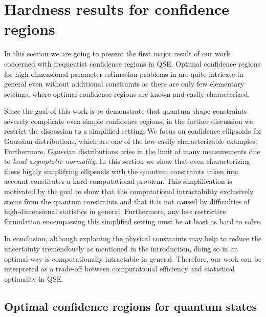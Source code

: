 \section{Hardness results for confidence regions}
\label{sec:error.ortho}

In this section we are going to present the first major result of our work~\cite{Suess_2016_Error} concerned with frequentist confidence regions in QSE.
Optimal confidence regions for high-dimensional parameter estimation problems in are quite intricate in general even without additional constraints as there are only few elementary settings, where optimal confidence regions are known and easily characterized.

Since the goal of this work is to demonstrate that quantum shape constraints severely complicate even  simple confidence regions, in the further discussion we restrict the discussion to a simplified setting:
We focus on confidence ellipsoids for Gaussian distributions, which are one of the few easily characterizable examples.
Furthermore, Gaussian distributions arise in the limit of many measurements due to \emph{local asymptotic normality}.
In this section we show that even characterizing these highly simplifying ellipsoids with the quantum constraints taken into account constitutes a hard computational problem.
This simplification is motivated by the goal to show that the computational intractability exclusively stems from the quantum constraints and that it is not caused by difficulties of high-dimensional statistics in general.
Furthermore, any less restrictive formulation encompassing this simplified setting must be at least as hard to solve.

In conclusion, although exploiting the physical constraints may help to reduce the uncertainty tremendously as mentioned in the introduction, doing so in an optimal way is computationally intractable in general.
Therefore, our work can be interpreted as a trade-off between computational efficiency and statistical optimality in QSE.

\subsection{Optimal confidence regions for quantum states}
\label{sub:ortho.optimal}

